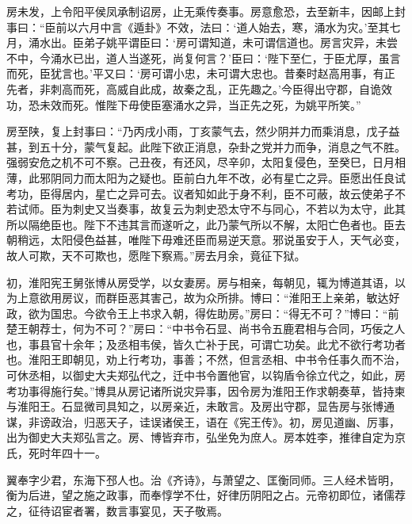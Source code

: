\documentclass[12pt,UTF8]{ctexbook}
\begin{document}
房未发，上令阳平侯凤承制诏房，止无乘传奏事。房意愈恐，去至新丰，因邮上封事曰：“臣前以六月中言《遁卦》不效，法曰：‘道人始去，寒，涌水为灾。’至其七月，涌水出。臣弟子姚平谓臣曰：‘房可谓知道，未可谓信道也。房言灾异，未尝不中，今涌水已出，道人当遂死，尚复何言？’臣曰：‘陛下至仁，于臣尤厚，虽言而死，臣犹言也。’平又曰：‘房可谓小忠，未可谓大忠也。昔秦时赵高用事，有正先者，非刺高而死，高威自此成，故秦之乱，正先趣之。’今臣得出守郡，自诡效功，恐未效而死。惟陛下毋使臣塞涌水之异，当正先之死，为姚平所笑。”



房至陕，复上封事曰：“乃丙戌小雨，丁亥蒙气去，然少阴并力而乘消息，戊子益甚，到五十分，蒙气复起。此陛下欲正消息，杂卦之党并力而争，消息之气不胜。强弱安危之机不可不察。己丑夜，有还风，尽辛卯，太阳复侵色，至癸巳，日月相薄，此邪阴同力而太阳为之疑也。臣前白九年不改，必有星亡之异。臣愿出任良试考功，臣得居内，星亡之异可去。议者知如此于身不利，臣不可蔽，故云使弟子不若试师。臣为刺史又当奏事，故复云为刺史恐太守不与同心，不若以为太守，此其所以隔绝臣也。陛下不违其言而遂听之，此乃蒙气所以不解，太阳亡色者也。臣去朝稍远，太阳侵色益甚，唯陛下毋难还臣而易逆天意。邪说虽安于人，天气必变，故人可欺，天不可欺也，愿陛下察焉。”房去月余，竟征下狱。



初，淮阳宪王舅张博从房受学，以女妻房。房与相亲，每朝见，辄为博道其语，以为上意欲用房议，而群臣恶其害己，故为众所排。博曰：“淮阳王上亲弟，敏达好政，欲为国忠。今欲令王上书求入朝，得佐助房。”房曰：“得无不可？”博曰：“前楚王朝荐士，何为不可？”房曰：“中书令石显、尚书令五鹿君相与合同，巧佞之人也，事县官十余年；及丞相韦侯，皆久亡补于民，可谓亡功矣。此尤不欲行考功者也。淮阳王即朝见，劝上行考功，事善；不然，但言丞相、中书令任事久而不治，可休丞相，以御史大夫郑弘代之，迁中书令置他官，以钩盾令徐立代之，如此，房考功事得施行矣。”博具从房记诸所说灾异事，因令房为淮阳王作求朝奏草，皆持柬与淮阳王。石显微司具知之，以房亲近，未敢言。及房出守郡，显告房与张博通谋，非谤政治，归恶天子，诖误诸侯王，语在《宪王传》。初，房见道幽、厉事，出为御史大夫郑弘言之。房、博皆弃市，弘坐免为庶人。房本姓李，推律自定为京氏，死时年四十一。



翼奉字少君，东海下邳人也。治《齐诗》，与萧望之、匡衡同师。三人经术皆明，衡为后进，望之施之政事，而奉惇学不仕，好律历阴阳之占。元帝初即位，诸儒荐之，征待诏宦者署，数言事宴见，天子敬焉。
\end{document}
